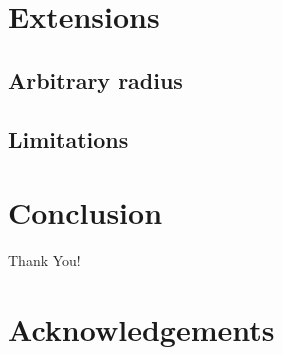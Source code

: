 \documentclass[twofold]{article}
\theoremstyle{plain}
\theoremstyle{definition}
\begin{document}
\section{Extensions}


\subsection{Arbitrary radius}

\subsection{Limitations}

\section{Conclusion}
Thank You!

\section{Acknowledgements}
\end{document}
